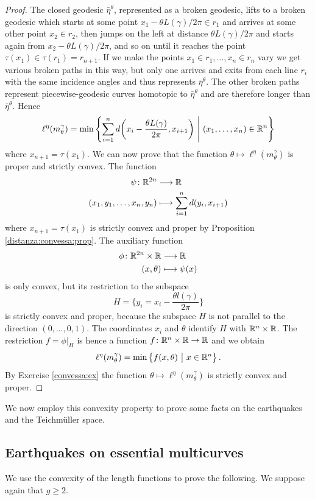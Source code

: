 \begin{proof}
The closed geodesic $\bar{\eta}^\theta$, represented as a broken geodesic, lifts to a broken geodesic which starts at some point $x_1-\theta L(\gamma)/2\pi\in r_1$ and arrives at some other point $x_2\in r_2$, then jumps on the left at distance $\theta L(\gamma)/2\pi$ and starts again from $x_2-\theta L(\gamma)/2\pi$, and so on until it reaches the point $\tau(x_1)\in \tau(r_1) = r_{n+1}$. If we make the points $x_1\in r_1, \ldots, x_n \in r_n$ vary we get various broken paths in this way, but only one arrives and exits from each line $r_i$ with the same incidence angles and thus represents $\bar{\eta}^\theta$. The other broken paths represent piecewise-geodesic curves homotopic to $\bar{\eta}^\theta$ and are therefore longer than $\bar{\eta}^\theta$. Hence
$$\ell^\eta(m_\theta^\gamma) = \min \left\{\sum_{i=1}^n d\bigg(x_i-\frac{\theta L(\gamma)}{2\pi}, x_{i+1}\bigg) \ \Bigg|\ (x_1,\ldots, x_n) \in \mathbb{R}^n \right\}$$
where $x_{n+1} = \tau(x_1)$.
We can now prove that the function $\theta \mapsto \ell^\eta(m_\theta^\gamma)$ is proper and strictly convex. The function
\begin{align*}
\psi\colon \mathbb{R}^{2n} & \longrightarrow \mathbb{R} \\
(x_1,y_1, \ldots, x_n,y_n) & \longmapsto \sum_{i=1}^n d(y_i,x_{i+1})
\end{align*}
where $x_{n+1}=\tau(x_1)$ is strictly convex and proper by Proposition \ref{distanza:convessa:prop}. The auxiliary function
\begin{align*}
\phi\colon \mathbb{R}^{2n}\times \mathbb{R} & \longrightarrow \mathbb{R} \\
(x,\theta) & \longmapsto \psi(x)
\end{align*}
is only convex, but its restriction to the subspace
$$H = \bigg\{y_i = x_i - \frac{\theta l(\gamma)}{2\pi} \bigg\}$$
is strictly convex and proper, because the subspace $H$ is not parallel to the direction $(0,\ldots,0,1)$. The coordinates $x_i$ and $\theta$ identify $H$ with $\mathbb{R}^n \times \mathbb{R}$. The restriction $f = \phi|_H$ is hence a function $f\colon \mathbb{R}^n \times \mathbb{R} \to \mathbb{R}$ and we obtain
$$\ell^\eta(m_\theta^\gamma) = \min \left\{f(x,\theta) \ \big| \ x \in \mathbb{R}^n \right\}.$$
By Exercise \ref{convessa:ex} the function $\theta \mapsto \ell^\eta(m_\theta^\gamma)$ is strictly convex and proper. 
\end{proof}

We now employ this convexity property to prove some facts on the earthquakes and the Teichm\"uller space.

\subsection{Earthquakes on essential multicurves}
We use the convexity of the length functions to prove the following. We suppose again that $g\geqslant 2$.

